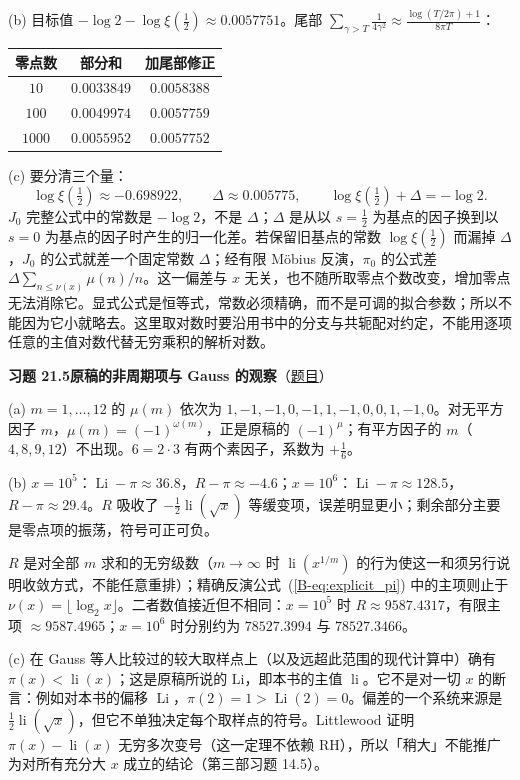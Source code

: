 \documentclass[11pt,a4paper]{article}
\DeclareMathOperator{\Li}{Li}
\DeclareMathOperator{\li}{li}
\newcommand{\bref}[1]{\ref*{B-#1}}
\newcommand{\Sol}[2]{%
  \par\addvspace{1.2em}\noindent
  \hypertarget{s:#1}{}\textbf{习题 #1\quad #2}\hfill{\small（\hyperlink{q:#1}{题目}）}\par
  \nopagebreak\smallskip}
\begin{document}
(b) 目标值 $-\log2-\log\xi(\frac12)\approx0.0057751$。尾部 $\sum_{\gamma>T}\frac1{4\gamma^2}\approx\frac{\log(T/2\pi)+1}{8\pi T}$：
\begin{center}
\small
\begin{tabular}{@{}ccc@{}}
\toprule
零点数 & 部分和 & 加尾部修正 \\
\midrule
$10$ & $0.0033849$ & $0.0058388$ \\
$100$ & $0.0049974$ & $0.0057759$ \\
$1000$ & $0.0055952$ & $0.0057752$ \\
\bottomrule
\end{tabular}
\end{center}

(c) 要分清三个量：
\[
  \log\xi(\tfrac12)\approx-0.698922,\qquad \Delta\approx0.005775,\qquad \log\xi(\tfrac12)+\Delta=-\log2 .
\]
$J_0$ 完整公式中的常数是 $-\log2$，不是 $\Delta$；$\Delta$ 是从以 $s=\frac12$ 为基点的因子换到以 $s=0$ 为基点的因子时产生的归一化差。若保留旧基点的常数 $\log\xi(\frac12)$ 而漏掉 $\Delta$，$J_0$ 的公式就差一个固定常数 $\Delta$；经有限 Möbius 反演，$\pi_0$ 的公式差 $\Delta\sum_{n\le\nu(x)}\mu(n)/n$。这一偏差与 $x$ 无关，也不随所取零点个数改变，增加零点无法消除它。显式公式是恒等式，常数必须精确，而不是可调的拟合参数；所以不能因为它小就略去。这里取对数时要沿用书中的分支与共轭配对约定，不能用逐项任意的主值对数代替无穷乘积的解析对数。

\Sol{21.5}{原稿的非周期项与 Gauss 的观察}
(a) $m=1,\dots,12$ 的 $\mu(m)$ 依次为 $1,-1,-1,0,-1,1,-1,0,0,1,-1,0$。对无平方因子 $m$，$\mu(m)=(-1)^{\omega(m)}$，正是原稿的 $(-1)^\mu$；有平方因子的 $m$（$4,8,9,12$）不出现。$6=2\cdot3$ 有两个素因子，系数为 $+\frac16$。

(b) $x=10^5$：$\Li-\pi\approx36.8$，$R-\pi\approx-4.6$；$x=10^6$：$\Li-\pi\approx128.5$，$R-\pi\approx29.4$。$R$ 吸收了 $-\frac12\li(\sqrt x)$ 等缓变项，误差明显更小；剩余部分主要是零点项的振荡，符号可正可负。

$R$ 是对全部 $m$ 求和的无穷级数（$m\to\infty$ 时 $\li(x^{1/m})$ 的行为使这一和须另行说明收敛方式，不能任意重排）；精确反演公式~(\bref{eq:explicit_pi}) 中的主项则止于 $\nu(x)=\lfloor\log_2x\rfloor$。二者数值接近但不相同：$x=10^5$ 时 $R\approx9587.4317$，有限主项 $\approx9587.4965$；$x=10^6$ 时分别约为 $78527.3994$ 与 $78527.3466$。

(c) 在 Gauss 等人比较过的较大取样点上（以及远超此范围的现代计算中）确有 $\pi(x)<\li(x)$；这是原稿所说的 $\mathrm{Li}$，即本书的主值 $\li$。它不是对一切 $x$ 的断言：例如对本书的偏移 $\Li$，$\pi(2)=1>\Li(2)=0$。偏差的一个系统来源是 $\frac12\li(\sqrt x)$，但它不单独决定每个取样点的符号。Littlewood 证明 $\pi(x)-\li(x)$ 无穷多次变号（这一定理不依赖 RH），所以「稍大」不能推广为对所有充分大 $x$ 成立的结论（第三部习题 14.5）。
\end{document}
